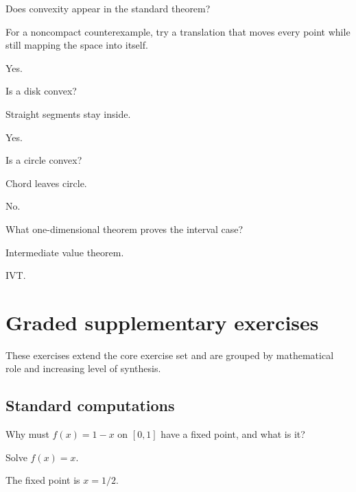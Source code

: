 \begin{exercise}\label{exr:ii17-05}
Does convexity appear in the standard theorem?
\end{exercise}
\begin{hint}
For a noncompact counterexample, try a translation that moves every point while still mapping the space into itself.
\end{hint}
\begin{solution}
Yes.
\end{solution}

\begin{exercise}\label{exr:ii17-06}
Is a disk convex?
\end{exercise}
\begin{hint}
Straight segments stay inside.
\end{hint}
\begin{solution}
Yes.
\end{solution}

\begin{exercise}\label{exr:ii17-07}
Is a circle convex?
\end{exercise}
\begin{hint}
Chord leaves circle.
\end{hint}
\begin{solution}
No.
\end{solution}

\begin{exercise}\label{exr:ii17-08}
What one-dimensional theorem proves the interval case?
\end{exercise}
\begin{hint}
Intermediate value theorem.
\end{hint}
\begin{solution}
IVT.
\end{solution}


\section{Graded supplementary exercises}
These exercises extend the core exercise set and are grouped by mathematical role and increasing level of synthesis.

\subsection*{Standard computations}

\begin{exercise}\label{exr:ii17-expand-01}
Why must \(f(x)=1-x\) on \([0,1]\) have a fixed point, and what is it?
\end{exercise}
\begin{hint}
Solve \(f(x)=x\).
\end{hint}
\begin{solution}
The fixed point is \(x=1/2\).
\end{solution}

